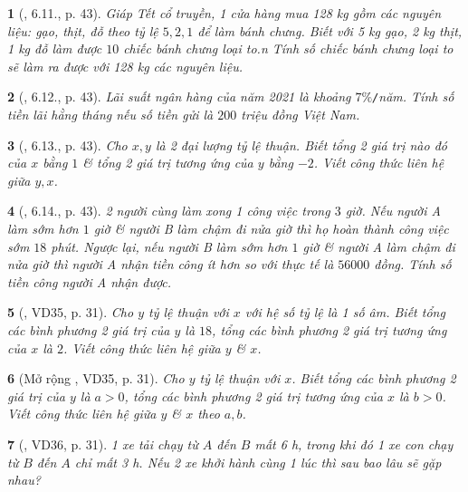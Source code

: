 \documentclass{article}
\newtheorem{baitoan}{}
\begin{document}
\begin{baitoan}[\cite{Binh_boi_duong_Toan_7_tap_1}, 6.11., p. 43]
	Giáp Tết cổ truyền, 1 cửa hàng mua {\rm128 kg} gồm các nguyên liệu: gạo, thịt, đỗ theo tỷ lệ $5,2,1$ để làm bánh chưng. Biết với {\rm5 kg} gạo, {\rm2 kg} thịt, {\rm1 kg} đỗ làm được $10$ chiếc bánh chưng loại to.n Tính số chiếc bánh chưng loại to sẽ làm ra được với {\rm128 kg} các nguyên liệu.
\end{baitoan}

\begin{baitoan}[\cite{Binh_boi_duong_Toan_7_tap_1}, 6.12., p. 43]
	Lãi suất ngân hàng của năm 2021 là khoảng $7\%${\tt/}năm. Tính số tiền lãi hằng tháng nếu số tiền gửi là $200$ triệu đồng Việt Nam.
\end{baitoan}

\begin{baitoan}[\cite{Binh_boi_duong_Toan_7_tap_1}, 6.13., p. 43]
	Cho $x,y$ là 2 đại lượng tỷ lệ thuận. Biết tổng 2 giá trị nào đó của $x$ bằng $1$ \& tổng 2 giá trị tương ứng của $y$ bằng $-2$. Viết công thức liên hệ giữa $y,x$.
\end{baitoan}

\begin{baitoan}[\cite{Binh_boi_duong_Toan_7_tap_1}, 6.14., p. 43]
	2 người cùng làm xong 1 công việc trong $3$ giờ. Nếu người A làm sớm hơn $1$ giờ \& người B làm chậm đi nửa giờ thì họ hoàn thành công việc sớm $18$ phút. Ngược lại, nếu người B làm sớm hơn $1$ giờ \& người A làm chậm đi nửa giờ thì người A nhận tiền công ít hơn so với thực tế là $56000$ đồng. Tính số tiền công người A nhận được.
\end{baitoan}

\begin{baitoan}[\cite{Tuyen_Toan_7}, VD35, p. 31]
	Cho $y$ tỷ lệ thuận với $x$ với hệ số tỷ lệ là 1 số âm. Biết tổng các bình phương 2 giá trị của $y$ là $18$, tổng các bình phương 2 giá trị tương ứng của $x$ là $2$. Viết công thức liên hệ giữa $y$ \& $x$.
\end{baitoan}

\begin{baitoan}[Mở rộng \cite{Tuyen_Toan_7}, VD35, p. 31]
	Cho $y$ tỷ lệ thuận với $x$. Biết tổng các bình phương 2 giá trị của $y$ là $a > 0$, tổng các bình phương 2 giá trị tương ứng của $x$ là $b > 0$. Viết công thức liên hệ giữa $y$ \& $x$ theo $a,b$.
\end{baitoan}

\begin{baitoan}[\cite{Tuyen_Toan_7}, VD36, p. 31]
	1 xe tải chạy từ $A$ đến $B$ mất {\rm6 h}, trong khi đó 1 xe con chạy từ $B$ đến $A$ chỉ mất {\rm3 h}. Nếu 2 xe khởi hành cùng 1 lúc thì sau bao lâu sẽ gặp nhau?
\end{baitoan}
\end{document}
